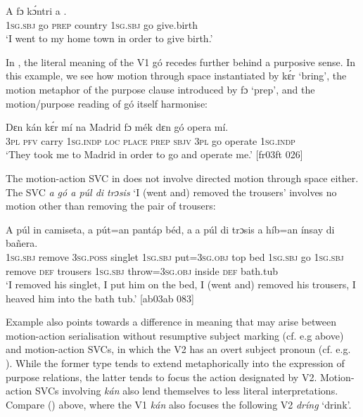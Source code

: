 \ea%
    \label{ex:key:1558}
    \gll A      fɔ  kɔ́ntri  a      .\\
\textsc{1sg.sbj}  go  \textsc{prep}  country  \textsc{1sg.sbj}  go  give.birth\\

\glt ‘I went to my home town in order to give birth.’
\z

In , the literal meaning of the V1 gó recedes further behind a purposive sense. In this example, we see how motion through space instantiated by kɛ́r ‘bring’, the motion metaphor of the purpose clause{\fff} introduced by fɔ ‘prep’, and the motion/purpose reading of gó itself harmonise:


\ea%
    \label{ex:key:1559}
    \gll Dɛn  kán  kɛ́r    mí    na  Madrid  fɔ  mék    dɛn  gó  opera  mí.\\
\textsc{3pl}  \textsc{pfv}  carry  \textsc{1sg.indp}  \textsc{loc}  \textsc{place}  \textsc{prep}  \textsc{sbjv}    \textsc{3pl}  go  operate  \textsc{1sg.indp}\\

\glt ‘They took me to Madrid in order to go and operate me.’ [fr03ft 026]
\z

The motion-action SVC in  does not involve directed motion through space either. The SVC \textit{a gó a púl di trɔsis} ‘I (went and) removed the trousers’ involves no motion other than removing the pair of trousers:


\ea%
    \label{ex:key:1560}
    \gll A    púl    in    camiseta,  a    pút=an    pantáp  béd,
a      a    púl    di  trɔsis  a    híb=an
ínsay  di  bañera.\\
\textsc{1sg.sbj}  remove  \textsc{3sg.poss}  singlet    \textsc{1sg.sbj}  put=\textsc{3sg.obj}  top    bed
\textsc{1sg.sbj}  go  \textsc{1sg.sbj}  remove  \textsc{def}  trousers  \textsc{1sg.sbj}  throw=\textsc{3sg.obj}
inside  \textsc{def}  bath.tub\\

\glt ‘I removed his singlet, I put him on the bed, I (went and) removed his trousers, 
I heaved him into the bath tub.’ [ab03ab 083]
\z

Example  also points towards a difference in meaning that may arise between motion-action serialisation without resumptive subject marking (cf. e.g  above) and motion-action SVCs, in which the V2 has an overt subject pronoun (cf. e.g. ). While the former type tends to extend metaphorically into the expression of purpose relations, the latter tends to focus the action designated by V2. Motion-action SVCs involving \textit{kán} also lend themselves to less literal interpretations. Compare () above, where the V1 \textit{kán} also focuses the following V2 \textit{dríng} ‘drink’. 

